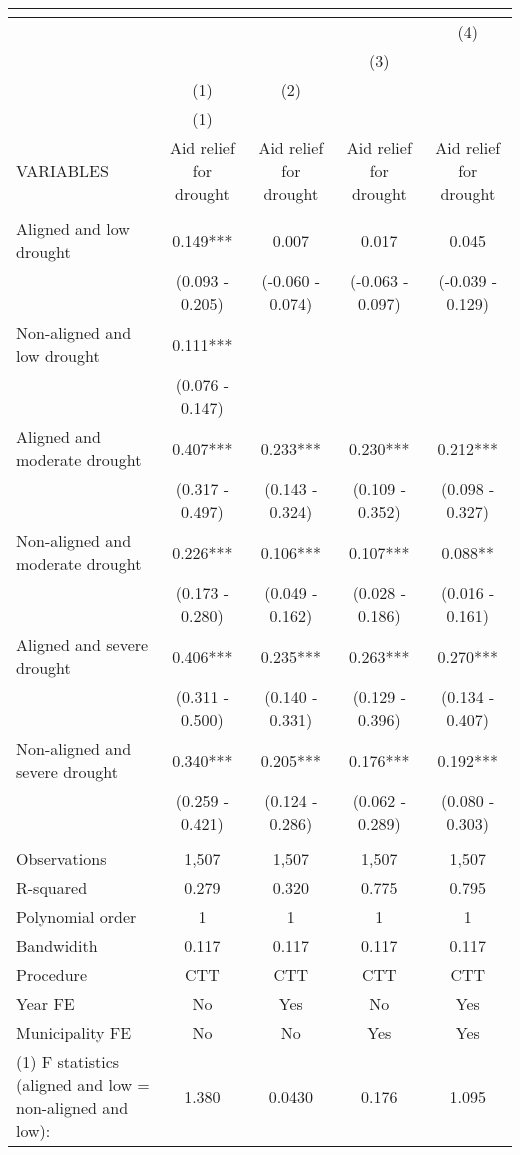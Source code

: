 \begin{tabular}{lcccc}
\multicolumn{5}{c}{} \\ \hline
 &  &  &  & (4) \\
 &  &  & (3) &  \\
 & (1) & (2) &  &  \\
 & (1) &  &  &  \\
VARIABLES & Aid relief for drought & Aid relief for drought & Aid relief for drought & Aid relief for drought \\ \hline
 &  &  &  &  \\
Aligned and low drought & 0.149*** & 0.007 & 0.017 & 0.045 \\
 & (0.093 - 0.205) & (-0.060 - 0.074) & (-0.063 - 0.097) & (-0.039 - 0.129) \\
Non-aligned and low drought & 0.111*** &  &  &  \\
 & (0.076 - 0.147) &  &  &  \\
Aligned and moderate drought & 0.407*** & 0.233*** & 0.230*** & 0.212*** \\
 & (0.317 - 0.497) & (0.143 - 0.324) & (0.109 - 0.352) & (0.098 - 0.327) \\
Non-aligned and moderate drought & 0.226*** & 0.106*** & 0.107*** & 0.088** \\
 & (0.173 - 0.280) & (0.049 - 0.162) & (0.028 - 0.186) & (0.016 - 0.161) \\
Aligned and severe drought & 0.406*** & 0.235*** & 0.263*** & 0.270*** \\
 & (0.311 - 0.500) & (0.140 - 0.331) & (0.129 - 0.396) & (0.134 - 0.407) \\
Non-aligned and severe drought & 0.340*** & 0.205*** & 0.176*** & 0.192*** \\
 & (0.259 - 0.421) & (0.124 - 0.286) & (0.062 - 0.289) & (0.080 - 0.303) \\
 &  &  &  &  \\
Observations & 1,507 & 1,507 & 1,507 & 1,507 \\
R-squared & 0.279 & 0.320 & 0.775 & 0.795 \\
Polynomial order & 1 & 1 & 1 & 1 \\
Bandwidith & 0.117 & 0.117 & 0.117 & 0.117 \\
Procedure & CTT & CTT & CTT & CTT \\
Year FE & No & Yes & No & Yes \\
Municipality FE & No & No & Yes & Yes \\
(1) F statistics (aligned and low = non-aligned and low): & 1.380 & 0.0430 & 0.176 & 1.095 \\

\end{tabular}
